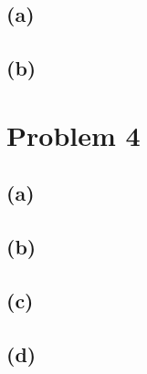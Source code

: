 \documentclass[12pt]{article}
\begin{document}
\subsection*{(a)}
\subsection*{(b)}

\newpage
\section*{Problem 4}
\subsection*{(a)}
\subsection*{(b)}
\subsection*{(c)}
\subsection*{(d)}
\end{document}
